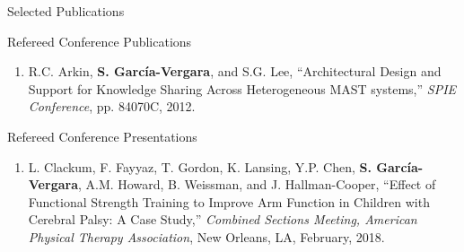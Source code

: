 \documentclass{resume} %
\newcommand{\Sergio}{\textbf{S. Garc\'{i}a-Vergara}}
\newcommand{\SuperPop}{Super Pop VR\textsuperscript{TM}\space}
\begin{document}
\begin{rSection}{Selected Publications}
\begin{rSubsection}{Refereed Conference Publications}{}{}{}
\begin{enumerate}
\iffalse
\item \Sergio, Y.P. Chen, and A.M. Howard, ``\textit{\SuperPop}: an Adaptable
  Virtual Reality Game for Upper-Body Rehabilitation,'' \textit{International
    Conference on Human-Computer Interaction}, pp. 40-49, 2013.
\fi

\item R.C. Arkin, \Sergio, and S.G. Lee, ``Architectural Design and Support for
  Knowledge Sharing Across Heterogeneous MAST systems,'' \textit{SPIE
    Conference}, pp. 84070C, 2012.

\iffalse
\item A.M. Howard, L. Roberts, \Sergio, and R. Quarells, ``Using Mixed Reality
  to Map Exercise Demonstrations to a Robot Exercise Coach,'' \textit{IEEE Mixed
    and Augmented Reality (ISMAR) Conference}, 2012.
\fi

\iffalse
\item P.J. Gonz\'{a}lez-Rivera, J. Santiago-Gonz\'{a}lez, \Sergio, and
  E. Ortiz-Rivera, ``Design of an Observer and Speed Controller for a DC Motor
  Fed by Fuel Cells and DC to DC Converters,'' \textit{IEEE Power and Energy
    Society General Meeting}, pp. 1-6, 2011.
\fi

\iffalse
\item \Sergio, P. Le\'{o}n, Y.J. D\'{i}az-Mercado, and E. Ortiz-Rivera, ``An
  Integrated Undergraduate Research Experience in Control, Power Electronics,
  and Design using a Micromouse,'' \textit{IEEE Frontiers in Education
    Conference}, pp. T3D-1, 2010.
\fi


\end{enumerate}
\end{rSubsection}




\iffalse

\begin{rSubsection}{Refereed Conference Presentations}{}{}{}
\item
\begin{enumerate}

\item L. Clackum, F. Fayyaz, T. Gordon, K. Lansing, Y.P. Chen, \Sergio,
  A.M. Howard, B. Weissman, and J. Hallman-Cooper, ``Effect of Functional
  Strength Training to Improve Arm Function in Children with Cerebral Palsy: A
  Case Study,'' \textit{Combined Sections Meeting, American Physical Therapy
    Association}, New Orleans, LA, February, 2018.


\end{enumerate}
\end{rSubsection}
\end{rSection}
\end{document}
